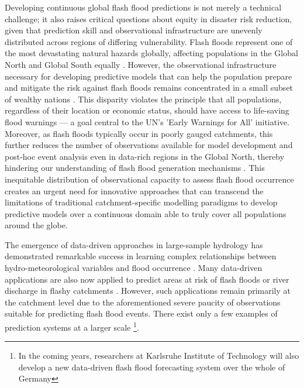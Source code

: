 Developing continuous global flash flood predictions is not merely a technical challenge; it also raises critical questions about equity in disaster risk reduction, given that prediction skill and observational infrastructure are unevenly distributed across regions of differing vulnerability. Flash floods represent one of the most devastating natural hazards globally, affecting populations in the Global North and Global South equally \citep{Dordevic_2020, Yin_2023}. However, the observational infrastructure necessary for developing predictive models that can help the population prepare and mitigate the risk against flash floods remains concentrated in a small subset of wealthy nations \citep{Kratzert_2023}. This disparity violates the principle that all populations, regardless of their location or economic status, should have access to life-saving flood warnings — a goal central to the UN's 'Early Warnings for All' initiative. Moreover, as flash floods typically occur in poorly gauged catchments, this further reduces the number of observations available for model development and post-hoc event analysis even in data-rich regions in the Global North, thereby hindering our understanding of flash flood generation mechanisms \citep{Gaume_2009, Gaume_2016}. This inequitable distribution of observational capacity to assess flash flood occurrence creates an urgent need for innovative approaches that can transcend the limitations of traditional catchment-specific modelling paradigms to develop predictive models over a continuous domain able to truly cover all populations around the globe.

The emergence of data-driven approaches in large-sample hydrology has demonstrated remarkable success in learning complex relationships between hydro-meteorological variables and flood occurrence \citep{Nearing_2024}. Many data-driven applications are also now applied to predict areas at risk of flash floods or river discharge in flashy catchments \citep{Oddo_2024, Zhao_2025}. However, such applications remain primarily at the catchment level due to the aforementioned severe paucity of observations suitable for predicting flash flood events. There exist only a few examples of prediction systems at a larger scale \citep{Liu_2018}\footnote{In the coming years, researchers at Karlsruhe Institute of Technology will also develop a new data-driven flash flood forecasting system over the whole of Germany}.

